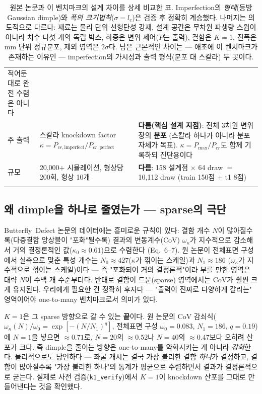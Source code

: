 \documentclass[11pt]{article}
\begin{document}
\begin{longtable}{@{}p{2.6cm}p{5.4cm}p{5.4cm}@{}}
  적어둔 대로 완전 수렴은 아니다 \\
\addlinespace
주 출력 &
  스칼라 knockdown factor $\kappa = P_{cr,\text{imperfect}}/P_{cr,\text{perfect}}$ &
  \textbf{다름(핵심 설계 지점)}: 전체 3차원 변위장의 \textbf{분포} (스칼라
  하나가 아니라 분포 자체가 목표). $\kappa = P_{\max}/P_{cr}$도 함께 기록하되
  진단용이다 \\
\addlinespace
규모 &
  20,000+ 시뮬레이션, 형상당 200회, 형상 10개 &
  \textbf{다름}: 158 설계점 $\times$ 64 draw $=$ 10{,}112 draw
  (train 150점 + t1 8점) \\
\bottomrule
\caption{원본 논문과 이 벤치마크의 설계 차이를 상세 비교한 표. Imperfection의
\emph{형태}(등방 Gaussian dimple)와 \emph{폭의 크기법칙}($\sigma=l_c$)은 검증
후 정확히 계승했다. 나머지는 의도적으로 다르다: 재료는 물리 단위 선형탄성
강재, 설계 공간은 무차원 파생량 스윕이 아니라 치수 다섯 개의 독립 박스, 하중은
변위 제어($P$는 출력), 결함은 $K{=}1$, 진폭은 mm 단위 정규분포, 제외 영역은
$2\sigma$다. 남은 근본적인 차이는 --- 애초에 이 벤치마크가 존재하는 이유인 ---
imperfection의 가시성과 출력 형식(분포 대 스칼라) 두 곳이다.}
\end{longtable}

\subsection{왜 dimple을 하나로 줄였는가 --- sparse의 극단}

Butterfly~Defect 논문의 데이터에는 흥미로운 규칙이 있다: 결함 개수 $N$이
많아질수록(다중결함 앙상블이 "포화"될수록) 결과의 변동계수(CoV) $\omega_\kappa$가
지수적으로 감소해서 거의 결정론적인 값($\kappa_0 \approx 0.61$)으로 수렴한다
(Eq.~6--7). 원 논문이 전체표면 구성에서 실측으로 맞춘 특성 개수는
$N_0 \approx 427$($\kappa$가 꺾이는 스케일)과 $N_1 \approx 186$
($\omega_\kappa$가 지수적으로 꺾이는 스케일)이다 --- 즉 "포화되어 거의
결정론적"이라 부를 만한 영역은 대략 $N$이 수백 개 수준부터다. 반대로 결함이
드문(sparse) 영역에서는 CoV가 훨씬 크게 유지된다. 우리에게 필요한 건 정확히
후자다 --- "출력이 진짜로 다양하게 갈리는" 영역이어야 one-to-many 벤치마크로서
의미가 있다.

$K{=}1$은 그 sparse 방향으로 갈 수 있는 \textbf{끝}이다. 원 논문의 CoV
감쇠식($\omega_\kappa(N)/\omega_0 = \exp[-(N/N_1)^q]$, 전체표면 구성
$\omega_0{=}0.083$, $N_1{=}186$, $q{=}0.19$)에 $N{=}1$을 넣으면 $\approx0.71$로,
$N{=}20$의 $\approx0.52$나 $N{=}40$의 $\approx0.47$보다 오히려 산포가 크다.
즉 dimple을 줄이는 방향은 one-to-many를 약화시키는 게 아니라 \emph{강화}한다.
물리적으로도 당연하다 --- 좌굴 개시는 결국 가장 불리한 결함 \emph{하나}가
결정하고, 결함이 많아질수록 "가장 불리한 하나"의 통계가 평균으로 수렴하면서
결과가 결정론적으로 굳는다. 실제로 사전 검증(\texttt{k1\_verify})에서 $K{=}1$이
knockdown 산포를 그대로 만들어낸다는 것을 확인했다.
\end{document}
